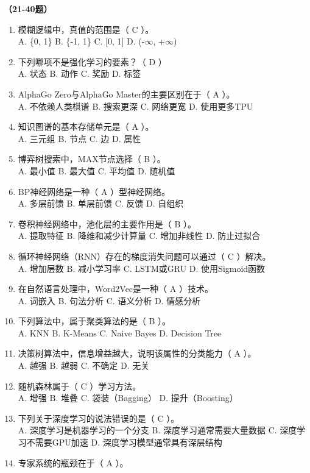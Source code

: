 \vspace{1em}
\textbf{（21-40题）}
\begin{enumerate}[resume,leftmargin=2em,itemsep=1pt]
\item 模糊逻辑中，真值的范围是（ C ）。
\\ A. \{0, 1\} B. \{-1, 1\} C. [0, 1] D. (-$\infty$, +$\infty$)
\item 下列哪项不是强化学习的要素？（ D ）
\\ A. 状态 B. 动作 C. 奖励 D. 标签
\item AlphaGo Zero与AlphaGo Master的主要区别在于（ A ）。
\\ A. 不依赖人类棋谱 B. 搜索更深 C. 网络更宽 D. 使用更多TPU
\item 知识图谱的基本存储单元是（ A ）。
\\ A. 三元组 B. 节点 C. 边 D. 属性
\item 博弈树搜索中，MAX节点选择（ B ）。
\\ A. 最小值 B. 最大值 C. 平均值 D. 随机值
\item BP神经网络是一种（ A ）型神经网络。
\\ A. 多层前馈 B. 单层前馈 C. 反馈 D. 自组织
\item 卷积神经网络中，池化层的主要作用是（ B ）。
\\ A. 提取特征 B. 降维和减少计算量 C. 增加非线性 D. 防止过拟合
\item 循环神经网络（RNN）存在的梯度消失问题可以通过（ C ）解决。
\\ A. 增加层数 B. 减小学习率 C. LSTM或GRU D. 使用Sigmoid函数
\item 在自然语言处理中，Word2Vec是一种（ A ）技术。
\\ A. 词嵌入 B. 句法分析 C. 语义分析 D. 情感分析
\item 下列算法中，属于聚类算法的是（ B ）。
\\ A. KNN B. K-Means C. Naive Bayes D. Decision Tree
\item 决策树算法中，信息增益越大，说明该属性的分类能力（ A ）。
\\ A. 越强 B. 越弱 C. 不确定 D. 无关
\item 随机森林属于（ C ）学习方法。
\\ A. 增强 B. 堆叠 C. 袋装（Bagging） D. 提升（Boosting）
\item 下列关于深度学习的说法错误的是（ C ）。
\\ A. 深度学习是机器学习的一个分支 B. 深度学习通常需要大量数据 C. 深度学习不需要GPU加速 D. 深度学习模型通常具有深层结构
\item 专家系统的瓶颈在于（ A ）。

\end{enumerate}
